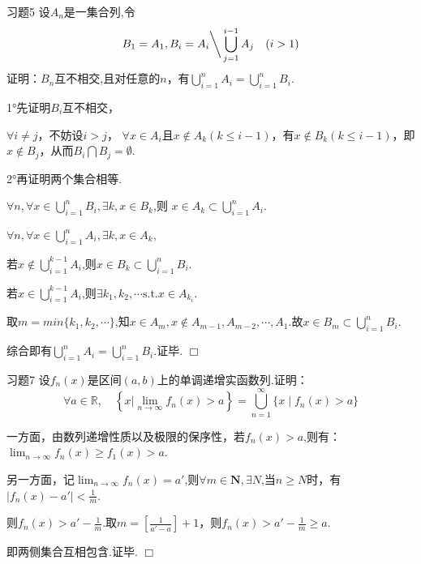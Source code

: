 \documentclass[11pt, a4paper, twoside]{ctexbook}
\newenvironment{proof2}{{\noindent\heiti 证明}}{\hfill $\Box $\par}
\begin{document}
	\begin{myproposition}{习题5}{}
		设${A_{n}}$是一集合列,令$$B_{1}=A_{1}, B_{i}=A_{i}\bigg \backslash \bigcup_{j=1}^{i-1} {A_{j}}\quad (i>1)$$
		证明：${B_{n}}$互不相交,且对任意的$n$，有$\bigcup\limits_{i=1}^{n} {A_{i}}=\bigcup\limits_{i=1}^{n} {B_{i}}$.
	\end{myproposition}
	\begin{proof2}
		1°先证明$B_{i}$互不相交，
		
		
		$\forall i\neq j$，不妨设$i>j$，
		$\forall x\in A_{i}$且$x\notin A_{k}(k\leq i-1)$，有$x\notin B_{k}(k\leq i-1)$，即$x\notin B_{j}$，从而$B_{i}\bigcap B_{j}=\emptyset $.
		
		
		2°再证明两个集合相等.
		
		
		$\forall n,\forall x \in \bigcup\limits_{i=1}^{n} {B_{i}},\exists k,x\in B_{k}$,则 $x\in A_{k}\subset \bigcup\limits_{i=1}^{n} {A_{i}} $.
		
		
		
		$\forall n,\forall x \in \bigcup\limits_{i=1}^{n} {A_{i}},\exists k,x\in A_{k}$,
		
		
		
		若$x\notin \bigcup\limits_{i=1}^{k-1}A_{i}$,则$x\in B_{k}\subset \bigcup\limits_{i=1}^{n} {B_{i}}$.
		
		
		
		若$x\in \bigcup\limits_{i=1}^{k-1}A_{i}$,则$\exists k_{1},k_{2},\cdots \mathrm{s.t.}x\in A_{k_{i}}$.
		
		
		
		取$m=min\{ k_{1},k_{2},\cdots \} $,知$x\in A_{m},x\notin A_{m-1},A_{m-2},\cdots,A_{1}$.故$x\in B_{m}\subset \bigcup\limits_{i=1}^{n} {B_{i}}$.
		
		
		
		综合即有$\bigcup\limits_{i=1}^{n} {A_{i}}=\bigcup\limits_{i=1}^{n} {B_{i}}$.证毕.
	\end{proof2}
	
	
	\begin{myproposition}{习题7}{}
		设$f_{n}(x)$是区间$(a,b)$上的单调递增实函数列.证明：
		$$\forall a\in \mathbb{R} ,\quad \left\{x\big|\lim_{n \to \infty}f_{n}(x)>a\right\}=\bigcup\limits_{n=1}^{\infty}\{x\mid f_{n}(x)>a\}$$
	\end{myproposition}
    \begin{proof2}
		一方面，由数列递增性质以及极限的保序性，若$f_{n}(x)>a$,则有：$\displaystyle\lim_{n \to \infty}f_{n}(x) \geq f_{1}(x) >a$.


       另一方面，记$\displaystyle\lim_{n \to \infty}f_{n}(x)=a'$,则$\forall m \in \mathbf{N},\exists N$,当$n\geq N$时，有$\mid f_{n}(x)-a'\mid < \displaystyle\frac{1}{m}$.


        则$f_{n}(x)>a'-\displaystyle\frac{1}{m}$.取$m=\left[\displaystyle\frac{1}{a'-a}\right]+1$，则$f_{n}(x)>a'-\displaystyle\frac{1}{m}\geq a$.


        即两侧集合互相包含.证毕.
	\end{proof2}
\end{document}
